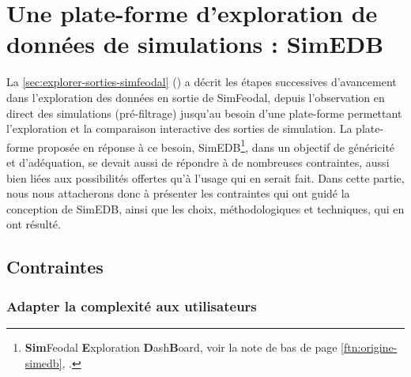 \clearpage
\section[Une plate-forme d'exploration de données de simulations : SimEDB]{Une plate-forme d'exploration de données de simulations : SimEDB%
}\label{sec:SimEDB}

La \cref{sec:explorer-sorties-simfeodal} () a décrit les étapes successives d'avancement dans l'exploration des données en sortie de SimFeodal, depuis l'observation en direct des simulations (\og pré-filtrage\fg{}) jusqu'au besoin d'une plate-forme permettant l'exploration et la comparaison interactive des sorties de simulation.
La plate-forme proposée en réponse à ce besoin, SimEDB\footnote{
\textbf{Sim}Feodal \textbf{E}xploration \textbf{D}ash\textbf{B}oard, voir la note de bas de page \ref{ftn:origine-simedb}, .
}, dans un objectif de généricité et d'adéquation, se devait aussi de répondre à de nombreuses contraintes, aussi bien liées aux possibilités offertes qu'à l'usage qui en serait fait.
Dans cette partie, nous nous attacherons donc à présenter les contraintes qui ont guidé la conception de SimEDB, ainsi que les choix, méthodologiques et techniques, qui en ont résulté.\vspace{-0.5cm}

\subsection{Contraintes}

\subsubsection{Adapter la complexité aux utilisateurs}


